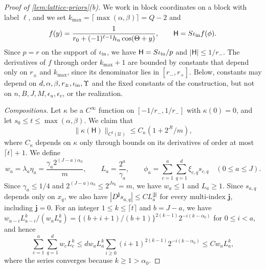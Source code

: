 \begin{proof}[Proof of \cref{lem:lattice-priors}(b)]
We work in block coordinates on a block with label $\ell$, and we set
$k_{\max}=\lceil\max(\alpha,\beta)\rceil=Q-2$ and
\[
 f(y)=\frac1{r_0+(-1)^{\ell-1}h_n\cos(\Theta+y)},\qquad
 \mathsf H=S\iota_{\rm in}f(\phi).
\]
Since $p=r$ on the support of $\iota_{\rm in}$, we have
$\mathsf H=S\iota_{\rm in}/p$ and $|\mathsf H|\le1/r_-$. The
derivatives of $f$ through order $k_{\max}+1$ are bounded by constants
that depend only on $r_\pm$ and $k_{\max}$, since its denominator lies in
$[r_-,r_+]$. Below, constants may depend on
$d,\alpha,\beta,r_\pm,\iota_{\rm in},\Upsilon$ and the fixed constants
of the construction, but not on $n,B,J,M,\epsilon_u,\epsilon_v$, or the
realization.

\emph{Compositions.} Let $\kappa$ be a $C^\infty$ function on
$[-1/r_-,1/r_-]$ with $\kappa(0)=0$, and let
$s_0\le t\le\max(\alpha,\beta)$. We claim that
\begin{equation}\label{lat:composition}
 \|\kappa(\mathsf H)\|_{C^t(\mathcal U)}\le C_\kappa(1+2^{Jt}/m),
\end{equation}
where $C_\kappa$ depends on $\kappa$ only through bounds on its
derivatives of order at most $\lceil t\rceil+1$. We define
\[
 w_a=\lambda_a\eta_a=\frac{\gamma_a2^{(J-a)\alpha_0}}m,\qquad
 L_a=\frac{2^a}{\gamma_a},\qquad
 \phi_a=\sum_{c=1}^a\sum_{q=1}^d\xi_{c,q}s_{c,q}\quad(0\le a\le J).
\]
Since $\gamma_a\le1/4$ and $2^{(J-a)\alpha_0}\le2^{Js_0}=m$, we have
$w_a\le1$ and $L_a\ge1$. Since $s_{a,q}$ depends only on $x_q$, we
also have $|D^{\mathbf j}s_{a,q}|\le CL_a^{|\mathbf j|}$ for every
multi-index $\mathbf j$, including $\mathbf j=0$. For an integer
$1\le k\le\lceil t\rceil$ and $b=J-a$, we have
$w_{a-i}L_{a-i}^k/(w_aL_a^k)=\{(b+i+1)/(b+1)\}^{2(k-1)}2^{-i(k-\alpha_0)}$
for $0\le i<a$, and hence
\begin{equation}\label{lat:earlier-levels}
 \sum_{c=1}^a\sum_{q=1}^dw_cL_c^k
 \le dw_aL_a^k\sum_{i\ge0}(i+1)^{2(k-1)}2^{-i(k-\alpha_0)}
 \le Cw_aL_a^k,
\end{equation}
where the series converges because $k\ge1>\alpha_0$.


\end{proof}
